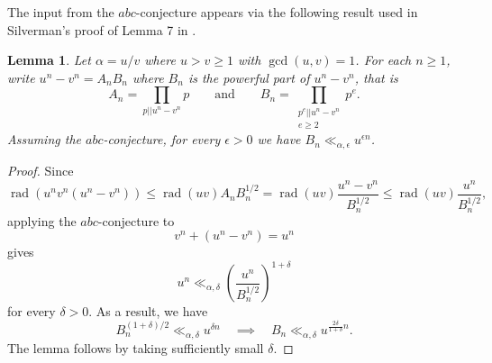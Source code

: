 \documentclass[10pt,a4paper]{amsart}
\newtheorem{lemma}[theorem]{Lemma}
\DeclareMathOperator{\rad}{rad}
\begin{document}
The input from the $abc$-conjecture appears via the following result used in Silverman's proof of Lemma 7 in \cite{Si88}.
\begin{lemma}\label{Silabc}
Let $\alpha=u/v$ where $u>v\geq 1$ with $\gcd(u,v)=1$. For each $n\geq 1$, write $u^n-v^n=A_nB_n$ where $B_n$ is the powerful part of $u^n-v^n$, that is
\[A_n=\prod_{p||u^n-v^n} p\qquad\text{and}\qquad 
  B_n=\prod_{\substack{p^e||u^n-v^n \\ e\geq 2}}p^e.\]
Assuming the $abc$-conjecture, for every $\epsilon>0$ we have
$B_n\ll_{\alpha,\epsilon} u^{\epsilon n}$.
\end{lemma}
\begin{proof}
Since
\[\rad(u^nv^n(u^n-v^n))\leq \rad(uv)A_nB_n^{1/2}=\rad(uv)\frac{u^n-v^n}{B_n^{1/2}}\leq\rad(uv)\frac{u^n}{B_n^{1/2}},\]
applying the $abc$-conjecture to
\[v^n+(u^n-v^n)=u^n\]
gives
\[u^n\ll_{\alpha,\delta}\left(\frac{u^n}{B_n^{1/2}}\right)^{1+\delta}\]
for every $\delta>0$. As a result, we have 
\[B_n^{(1+\delta)/2}\ll_{\alpha,\delta}u^{\delta n}\quad\implies\quad
B_n\ll_{\alpha,\delta}u^{\frac{2\delta}{1+\delta}n}.\]
The lemma follows by taking sufficiently small $\delta$. 
\end{proof}
\end{document}
